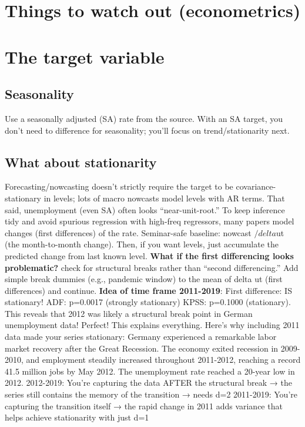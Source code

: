 \documentclass{article}
\begin{document}
\section{Things to watch out (econometrics)}

\section{The target variable}
\subsection{Seasonality}
Use a seasonally adjusted (SA) rate from the source. 
With an SA target, you don’t need to difference for seasonality; you’ll focus on trend/stationarity next.

\subsection{What about stationarity}
Forecasting/nowcasting doesn’t strictly require the target to be covariance-stationary in levels; lots of macro nowcasts model levels with AR terms.
That said, unemployment (even SA) often looks “near-unit-root.” To keep inference tidy and avoid spurious regression with high-freq regressors, many papers model changes (first differences) of the rate.
Seminar-safe baseline: nowcast $/delta$ut (the month-to-month change). Then, if you want levels, just accumulate the predicted change from last known level.
\textbf{What if the first differencing looks problematic?} check for structural breaks rather than “second differencing.” Add simple break dummies (e.g., pandemic window) to the mean of delta ut (first differences) and continue. 
\textbf{Idea of time frame 2011-2019}: First difference: IS stationary!  ADF: p=0.0017 (strongly stationary) KPSS: p=0.1000 (stationary).
This reveals that 2012 was likely a structural break point in German unemployment data!
Perfect! This explains everything. Here's why including 2011 data made your series stationary: Germany experienced a remarkable labor market recovery after the Great Recession. The economy exited recession in 2009-2010, and employment steadily increased throughout 2011-2012, reaching a record 41.5 million jobs by May 2012. The unemployment rate reached a 20-year low in 2012.
2012-2019: You're capturing the data AFTER the structural break → the series still contains the memory of the transition → needs d=2
2011-2019: You're capturing the transition itself → the rapid change in 2011 adds variance that helps achieve stationarity with just d=1
\end{document}
